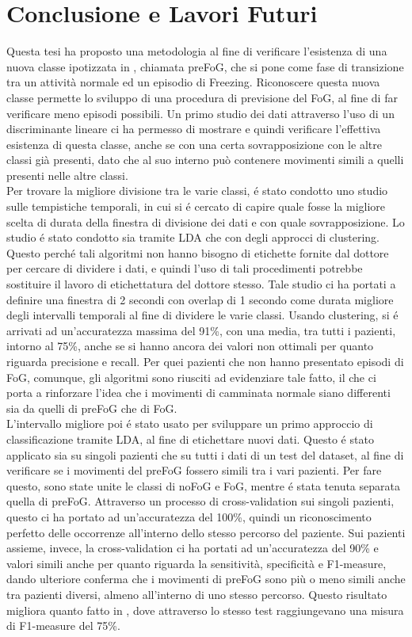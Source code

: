 
\chapter{Conclusione e Lavori Futuri}\label{chap9:Concl}
Questa tesi ha proposto una metodologia al fine di verificare l'esistenza di una nuova classe ipotizzata in \cite{12}, chiamata preFoG, che si pone come fase di transizione tra un attività normale ed un episodio di Freezing. Riconoscere questa nuova classe permette lo sviluppo di una procedura di previsione del FoG, al fine di far verificare meno episodi possibili. Un primo studio dei dati attraverso l'uso di un discriminante lineare ci ha permesso di mostrare e quindi verificare l'effettiva esistenza di questa classe, anche se con una certa sovrapposizione con le altre classi già presenti, dato che al suo interno può contenere movimenti simili a quelli presenti nelle altre classi.\\ 
Per trovare la migliore divisione tra le varie classi, é stato condotto uno studio sulle tempistiche temporali, in cui si é cercato di capire quale fosse la migliore scelta di durata della finestra di divisione dei dati e con quale sovrapposizione. Lo studio é stato condotto sia tramite LDA che con degli approcci di clustering. Questo perché tali algoritmi non hanno bisogno di etichette fornite dal dottore per cercare di dividere i dati, e quindi l'uso di tali procedimenti potrebbe sostituire il lavoro di etichettatura del dottore stesso. Tale studio ci ha portati a definire una finestra di 2 secondi con overlap di 1 secondo come durata migliore degli intervalli temporali al fine di dividere le varie classi. Usando clustering, si é arrivati ad un'accuratezza massima del 91\%, con una media, tra tutti i pazienti, intorno al 75\%, anche se si hanno ancora dei valori non ottimali per quanto riguarda precisione e recall. Per quei pazienti che non hanno presentato episodi di FoG, comunque, gli algoritmi sono riusciti ad evidenziare tale fatto, il che ci porta a rinforzare l'idea che i movimenti di camminata normale siano differenti sia da quelli di preFoG che di FoG.\\
L'intervallo migliore poi é stato usato per sviluppare un primo approccio di classificazione tramite LDA, al fine di etichettare nuovi dati. Questo é stato applicato sia su singoli pazienti che su tutti i dati di un test del dataset, al fine di verificare se i movimenti del preFoG fossero simili tra i vari pazienti. Per fare questo, sono state unite le classi di noFoG e FoG, mentre é stata tenuta separata quella di preFoG. Attraverso un processo di cross-validation sui singoli pazienti, questo ci ha portato ad un'accuratezza del 100\%, quindi un riconoscimento perfetto delle occorrenze all'interno dello stesso percorso del paziente. Sui pazienti assieme, invece, la cross-validation ci ha portati ad un'accuratezza del 90\% e valori simili anche per quanto riguarda la sensitività, specificità e F1-measure, dando ulteriore conferma che i movimenti di preFoG sono più o meno simili anche tra pazienti diversi, almeno all'interno di uno stesso percorso. Questo risultato migliora quanto fatto in \cite{12}, dove attraverso lo stesso test raggiungevano una misura di F1-measure del 75\%.\\
